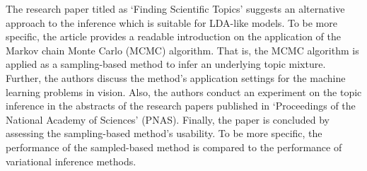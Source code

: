 \documentclass{mprop}
\begin{document}
\par The research paper titled as `Finding Scientific Topics' \cite{griffiths} suggests an alternative approach to the inference which is suitable for LDA-like models. To be more specific, the article provides a readable introduction on the application of the Markov chain Monte Carlo (MCMC) algorithm. That is, the MCMC algorithm is applied as a sampling-based method to infer an underlying topic mixture. Further, the authors discuss the method's application settings for the machine learning problems in vision. Also, the authors conduct an experiment on the topic inference in the abstracts of the research papers published in `Proceedings of the National Academy of Sciences' (PNAS). Finally, the paper is concluded by assessing the sampling-based method's usability. To be more specific, the performance of the sampled-based method is compared to the performance of variational inference methods. 
\end{document}
